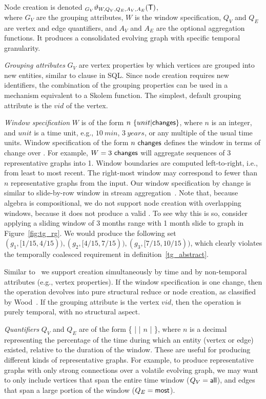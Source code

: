 Node creation is denoted $_{G_V}\vartheta_{W,Q_V,Q_E,A_V,A_E}
(\mathsf{T})$,\\ where $G_V$ are the grouping attributes, $W$ is the window
specification, $Q_V$ and $Q_E$ are vertex and edge quantifiers, and
$A_V$ and $A_E$ are the optional aggregation functions.  It produces a
consolidated evolving graph with specific temporal granularity.

{\em Grouping attributes} $G_V$ are vertex properties by which
vertices are grouped into new entities, similar to 
clause in SQL.  Since node creation requires new identifiers, the
combination of the grouping properties can be used in a mechanism
equivalent to a Skolem function.  The simplest, default grouping
attribute is the $vid$ of the vertex.

{\em Window specification} $W$ is of the form
$n~\{unit|\textsf{changes}\}$, where $n$ is an integer, and $unit$ is a
time unit, e.g., $10~min$, $3~years$, or any multiple of the usual
time units.  Window specification of the form $n~\textsf{changes}$
defines the window in terms of change over \trg.  For example,
$W=3~\textsf{changes}$ will aggregate sequences of 3 representative
graphs into 1.  Window boundaries are computed left-to-right, i.e.,
from least to most recent.  The right-most window may correspond to
fewer than $n$ representative graphs from the input.
%
Our window specification by change is similar to slide-by-row window
in stream aggregation~\cite{Li2005}.  Note that, because \tg algebra
is compositional, we do not support node creation with
overlapping windows, because it does not produce a valid \tg.  To see
why this is so, consider applying a sliding window of 3 months range
with 1 month slide to graph  in Figure~\ref{fig:tg_rg}.  We
would produce the following set $(g_1, [1/15, 4/15)), (g_2, [4/15,
    7/15)), (g_3, [7/15, 10/15))$, which clearly violates the
      temporally coalesced requirement in
      definition~\ref{tg_abstract}.  

Similar to~\cite{Li2005} we support creation simultaneously by time
and by non-temporal attributes (e.g., vertex properties).  If the
window specification is one change, then the operation devolves into
pure structural reduce or node creation, as classified by
Wood~\cite{Wood2012}.  If the grouping attribute is the vertex $vid$,
then the operation is purely temporal, with no structural aspect.

{\em Quantifiers} $Q_V$ and $Q_E$ are of the form \{  |
 |  $n$ |  \}, where $n$ is
a decimal representing the percentage of the time during which an
entity (vertex or edge) existed, relative to the duration of the
window. These are useful for producing different kinds of
representative graphs.  For example, to produce representative graphs
with only strong connections over a volatile evolving graph, we may
want to only include vertices that span the entire time window
($Q_V=\textsf{all}$), and edges that span a large portion of the window
($Q_E=\textsf{most}$).
 
